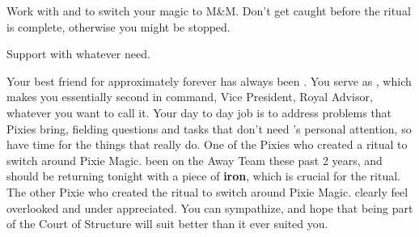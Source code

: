 \documentclass[char]{PP}
\begin{document}
\begin{itemz}
	\item Work with \cMChange{} and \cFWanabe{} to switch your magic to M&M. Don't get caught before the ritual is complete, otherwise you might be stopped.
	\item Support \cSHead{} with whatever \cSHead{\they} need\cSHead{\plural}.
\end{itemz}

\begin{itemz}[Notes]
	\item 
\end{itemz}

\begin{contacts}
	\contact{\cSHead{}} Your best friend for approximately forever has always been \cSHead{}. You serve as \cSHead{\Their} \cSAdvisor{\Prince}, which makes you essentially \cSHead{\their}second in command, Vice President, Royal Advisor, whatever you want to call it. Your day to day job is to address problems that Pixies bring, fielding questions and tasks that don't need \cSHead{}'s personal attention, so \cSHead{\They} have time for the things that really do.
	\contact{\cMChange{}}  One of the Pixies who created a ritual to switch around Pixie Magic. \cMChange{\They} \cMChange{\have} been on the Away Team these past 2 years, and should be returning tonight with a piece of \textbf{iron}, which is crucial for the ritual.
	\contact{\cFWanabe{}} The other Pixie who created the ritual to switch around Pixie Magic. \cFWanabe{\They} clearly feel\cFWanabe{\plural} overlooked and under appreciated. You can sympathize, and hope that being part of the Court of Structure will suit \cFWanabe{} better than it ever suited you.
\end{contacts}
\end{document}
